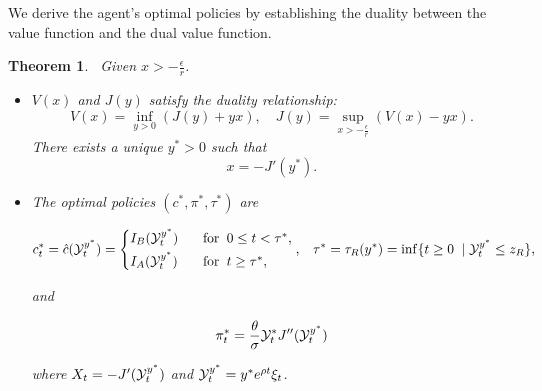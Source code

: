 \documentclass[a4paper,report, 11pt]{article}
\newtheorem{theorem}{Theorem}[section]
\def\e{\epsilon}
\def\s{\sigma}
\def\t{\theta}
\begin{document}
We derive the agent's optimal policies by establishing the duality between the value function and the dual value function. 
\begin{theorem}~\label{thm:main} Given  $x>-\frac{\e}{r}$. 
	\begin{itemize} 
		\item[(a)] $V(x)$ and $J(y)$ satisfy the duality relationship:
		\begin{equation}\label{eq:duality}
			V(x) = \inf_{y>0} \left(J(y)  + y x\right), \quad 	J(y) = \sup_{x>-\frac{\e}{r}} \left(V(x)  - y x\right).
		\end{equation}
		There exists a unique $y^*>0$ such that 
		\begin{equation*}
			x = -J'(y^*). 
		\end{equation*}
		\item[(b)] The optimal policies $(c^*, \pi^*, \tau^*)$ are 
		\begin{footnotesize}
			\begin{eqnarray*}
				\begin{split}
					c_t^* =\hat{c}({\cal Y}_t^{y^*})=  
					\begin{cases}
						I_B({\cal Y}_t^{y^*})\;\;\;&\mbox{for}\;\;0\le t < \tau^*,\vspace{1mm}\\
						I_A({\cal Y}_t^{y^*})\;\;\;&\mbox{for}\;\;t \ge \tau^*,
					\end{cases},\;\;\;\tau^*=\tau_R(y^*)=\inf\{t\ge0\;\mid {\cal Y}_t^{y^*}\le z_R \},
				\end{split}
			\end{eqnarray*}
		\end{footnotesize}
		and 
		\begin{footnotesize}
			\begin{eqnarray*}
			\pi_t^*=\dfrac{\t}{\s}{\cal Y}_t^* J''({\cal Y}_t^{y^*})
			\end{eqnarray*}
		\end{footnotesize}
		where $X_t = - J^{\prime}({\cal Y}_t^{y^*})$ and ${\cal Y}_t^{y^*} = y^* e^{\rho t }{\xi}_t$.
		
		
	\end{itemize}
\end{theorem}
\end{document}
